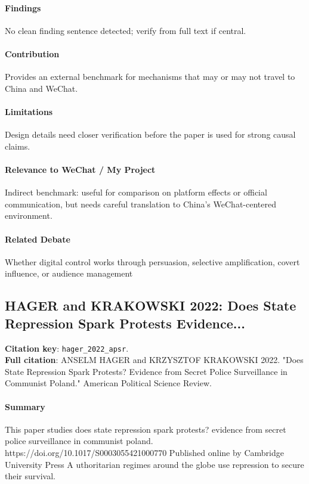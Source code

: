 \documentclass[12pt]{article}
\begin{document}
\paragraph{Findings} No clean finding sentence detected; verify from full text if central.

\paragraph{Contribution} Provides an external benchmark for mechanisms that may or may not travel to China and WeChat.

\paragraph{Limitations} Design details need closer verification before the paper is used for strong causal claims.

\paragraph{Relevance to WeChat / My Project} Indirect benchmark: useful for comparison on platform effects or official communication, but needs careful translation to China's WeChat-centered environment.

\paragraph{Related Debate} Whether digital control works through persuasion, selective amplification, covert influence, or audience management


\subsection{HAGER and KRAKOWSKI 2022: Does State Repression Spark Protests Evidence...}
\textbf{Citation key}: \texttt{hager\_2022\_apsr}.\\
\textbf{Full citation}: ANSELM HAGER and KRZYSZTOF KRAKOWSKI 2022. "Does State Repression Spark Protests? Evidence from Secret Police Surveillance in Communist Poland." American Political Science Review.

\paragraph{Summary} This paper studies does state repression spark protests? evidence from secret police surveillance in communist poland. https://doi.org/10.1017/S0003055421000770 Published online by Cambridge University Press A uthoritarian regimes around the globe use repression to secure their survival.
\end{document}
